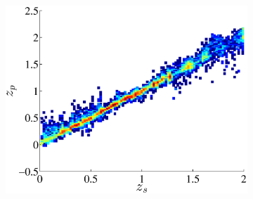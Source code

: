 \documentclass[useAMS,usenatbib,fleqn]{mn2e}
\begin{document}
\begin{figure}
\begin{subfigure}[b]{0.3\columnwidth}
                \includegraphics[width=\textwidth]{figures/23_J.eps}
        \end{subfigure}
        

\end{figure}
\end{document}
